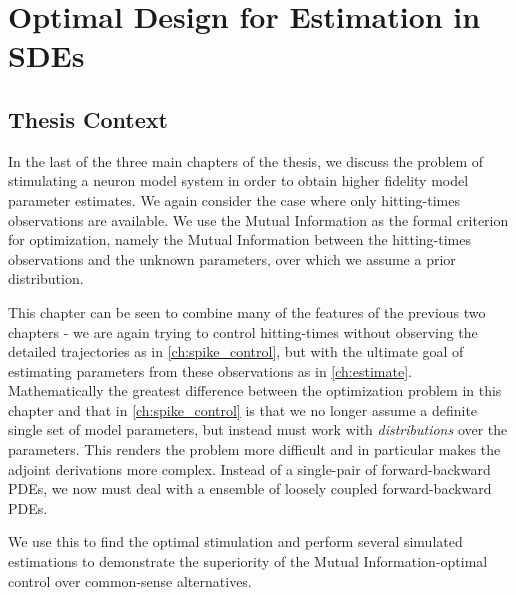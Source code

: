 \chapter{Optimal Design for Estimation in SDEs}
\label{ch:optimal_design}
\graphicspath{{../OptEstimate/}}

 
\section{Thesis Context}
 In the last of the three main chapters of the thesis, we discuss the problem of
 stimulating a neuron model system in order to obtain higher fidelity model
 parameter estimates. We again consider the case where only hitting-times
 observations are available.  
 We use the Mutual Information as the formal criterion for
 optimization, namely the Mutual Information between the hitting-times
 observations and the unknown parameters, over which we assume a prior
 distribution.  

 This chapter can be seen to combine many of the features of the previous two
 chapters - we are again trying to control hitting-times without observing the
 detailed trajectories as in \cref{ch:spike_control}, but with the ultimate
 goal of estimating parameters from these observations as in \cref{ch:estimate}.
 Mathematically the greatest difference between the optimization problem in this chapter and that
 in \cref{ch:spike_control} is that we no longer assume a definite single set of
 model parameters, but instead must work with {\sl distributions} over the
 parameters. This renders the problem more difficult and in particular makes the
 adjoint derivations more complex. Instead of a single-pair of forward-backward
 PDEs, we now must deal with a ensemble of loosely coupled forward-backward
 PDEs.
 
 We use this to find the optimal stimulation and perform several simulated
 estimations to demonstrate the superiority of the Mutual Information-optimal
 control over common-sense alternatives.
 
 
